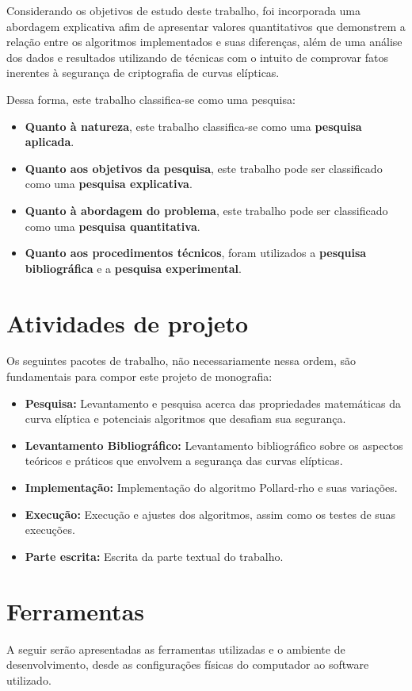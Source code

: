 Considerando os objetivos de estudo deste trabalho, foi incorporada uma abordagem explicativa afim de apresentar valores quantitativos que demonstrem a relação entre os algoritmos implementados e suas diferenças, além de uma análise dos dados e resultados utilizando de técnicas com o intuito de comprovar fatos inerentes à segurança de criptografia de curvas elípticas.

Dessa forma, este trabalho classifica-se como uma pesquisa:
\begin{itemize}
\item \textbf{Quanto à natureza}, este trabalho classifica-se como uma \textbf{pesquisa aplicada}.
\item \textbf{Quanto aos objetivos da pesquisa}, este trabalho pode ser classificado como uma \textbf{pesquisa explicativa}.
\item \textbf{Quanto à abordagem do problema}, este trabalho pode ser classificado como uma \textbf{pesquisa quantitativa}.
\item \textbf{Quanto aos procedimentos técnicos}, foram utilizados a \textbf{pesquisa bibliográfica} e a \textbf{pesquisa experimental}.
\end{itemize}

%
%
\section{Atividades de projeto}
Os seguintes pacotes de trabalho, não necessariamente nessa ordem, são fundamentais para compor este projeto de monografia:
\begin{itemize}
\item \textbf{Pesquisa:} Levantamento e pesquisa acerca das propriedades matemáticas da curva elíptica e potenciais algoritmos que desafiam sua segurança.
\item \textbf{Levantamento Bibliográfico:} Levantamento bibliográfico sobre os aspectos teóricos e práticos que envolvem a segurança das curvas elípticas.
\item \textbf{Implementação:} Implementação do algoritmo Pollard-rho e suas variações.
\item \textbf{Execução:} Execução e ajustes dos algoritmos, assim como os testes de suas execuções.
\item \textbf{Parte escrita:} Escrita da parte textual do trabalho.
\end{itemize}

%
%
\section{Ferramentas}
A seguir serão apresentadas as ferramentas utilizadas e o ambiente de desenvolvimento, desde as configurações físicas do computador ao software utilizado.

